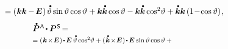 \begin{otherlanguage}{russian}
\begin{fleqn}[0pt]
\begin{multline*}
%
\shoveright{\hfill \hspace{4.8em} \scalebox{0.94}[0.96]{$= \left( \hspace{.1ex} \bm{k} \bm{k} \hspace{-0.1ex} - \hspace{-0.2ex} \bm{E} \hspace{.1ex} \right) \hspace{-0.1ex} \mathdotabove{\vartheta} \operatorname{sin} \vartheta \operatorname{cos} \vartheta \hspace{.1ex}
+ \bm{k} \mathdotabove{\bm{k}} \operatorname{cos} \vartheta
- \bm{k} \mathdotabove{\bm{k}} \operatorname{cos}^{2\hspace{-0.4ex}} \vartheta
+ \mathdotabove{\bm{k}} \bm{k} \left({1 \!-\! \operatorname{cos} \vartheta}\right) \hspace{-0.16ex},$}}
\end{multline*}
\begin{multline*}
\shoveleft{\scalebox{0.94}[0.96]{$\mathdotabove{\bm{P}}^{\mathsf{\hspace{.12ex}A}} \hspace{-0.2ex}\dotp \bm{P}^{\mathsf{\hspace{.12ex}S}} \hspace{-0.25ex} = $} \hfill} \\[-0.25em]
%
\shoveleft{\scalebox{0.8}[0.82]{$= ( \hspace{.12ex} \bm{k} \hspace{-0.24ex}\times\hspace{-0.4ex} \bm{E} \hspace{.1ex} ) \hspace{-0.2ex} \dotp \hspace{-0.2ex} \bm{E} \hspace{.4ex} \mathdotabove{\vartheta} \operatorname{cos}^{2\hspace{-0.4ex}} \vartheta +
( \hspace{.12ex} \mathdotabove{\bm{k}} \hspace{-0.24ex}\times\hspace{-0.4ex} \bm{E} \hspace{.1ex} ) \hspace{-0.2ex} \dotp \hspace{-0.2ex} \bm{E} \hspace{.1ex} \operatorname{sin} \vartheta \operatorname{cos} \vartheta \:+$} \hfill} \\[-0.2em]

\end{multline*}
\end{fleqn}
\end{otherlanguage}
